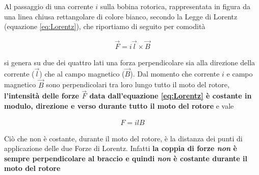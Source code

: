 \documentclass[17pt]{extarticle}
\begin{document}


Al passaggio di una corrente $i$ sulla bobina rotorica, rappresentata in figura da una linea chiusa rettangolare di colore bianco, secondo la Legge di Lorentz (equazione \ref{eq:Lorentz}), che riportiamo di seguito per comodità


\begin{eqnarray}\nonumber%
	\vec{F} = i\vec{l}\times\vec{B}
\end{eqnarray}

si genera su due dei quattro lati una forza perpendicolare sia alla direzione della corrente ($\vec{l}$) che al campo magnetico ($\vec{B}$). Dal momento che corrente $i$ e campo magnetico $\vec{B}$ sono perpendicolari tra loro lungo tutto il moto del rotore, {\bf l'intensità delle forze $\vec{F}$ data dall'equazione \ref{eq:Lorentz} è costante in modulo, direzione e verso durante tutto il moto del rotore} e vale

\begin{eqnarray}
	F = ilB
\end{eqnarray}

Ciò che non è costante, durante il moto del rotore, è la distanza dei punti di applicazione delle due Forze di Lorentz. Infatti
{\bf la coppia di forze \emph{non} è sempre perpendicolare al braccio e quindi \emph{non} è costante durante il moto del rotore}
\end{document}
